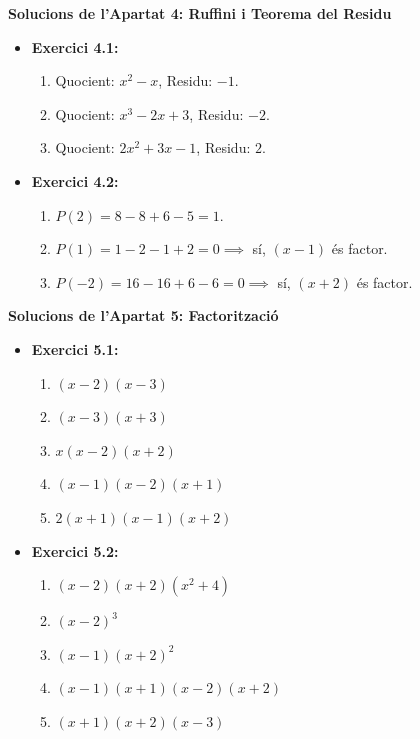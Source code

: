 \documentclass[12pt]{article}
\begin{document}
\begin{solucio}
\textbf{Solucions de l'Apartat 4: Ruffini i Teorema del Residu}
\begin{itemize}
    \item \textbf{Exercici 4.1:}
    \begin{enumerate}[label=\alph*)]
        \item Quocient: $x^2 - x$, Residu: $-1$.
        \item Quocient: $x^3 - 2x + 3$, Residu: $-2$.
        \item Quocient: $2x^2 + 3x - 1$, Residu: $2$.
    \end{enumerate}
    \item \textbf{Exercici 4.2:}
    \begin{enumerate}[label=\alph*)]
        \item $P(2) = 8 - 8 + 6 - 5 = 1$.
        \item $P(1) = 1 - 2 - 1 + 2 = 0 \implies$ sí, $(x-1)$ és factor.
        \item $P(-2) = 16 - 16 + 6 - 6 = 0 \implies$ sí, $(x+2)$ és factor.
    \end{enumerate}
\end{itemize}
\end{solucio}

\begin{solucio}
\textbf{Solucions de l'Apartat 5: Factorització}
\begin{itemize}
    \item \textbf{Exercici 5.1:}
    \begin{enumerate}[label=\alph*)]
        \item $(x-2)(x-3)$
        \item $(x-3)(x+3)$
        \item $x(x-2)(x+2)$
        \item $(x-1)(x-2)(x+1)$
        \item $2(x+1)(x-1)(x+2)$
    \end{enumerate}
    \item \textbf{Exercici 5.2:}
    \begin{enumerate}[label=\alph*)]
        \item $(x-2)(x+2)(x^2+4)$
        \item $(x-2)^3$
        \item $(x-1)(x+2)^2$
        \item $(x-1)(x+1)(x-2)(x+2)$
        \item $(x+1)(x+2)(x-3)$
    \end{enumerate}
\end{itemize}
\end{solucio}
\end{document}
